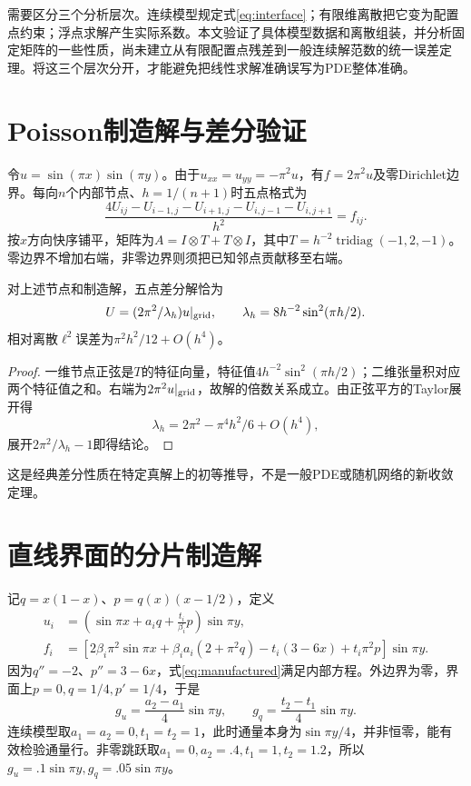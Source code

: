 需要区分三个分析层次。连续模型规定式\eqref{eq:interface}；有限维离散把它变为配置点约束；浮点求解产生实际系数。本文验证了具体模型数据和离散组装，并分析固定矩阵的一些性质，尚未建立从有限配置点残差到一般连续解范数的统一误差定理。将这三个层次分开，才能避免把线性求解准确误写为PDE整体准确。

\section{Poisson制造解与差分验证}
令$u=\sin(\pi x)\sin(\pi y)$。由于$u_{xx}=u_{yy}=-\pi^2u$，有$f=2\pi^2u$及零Dirichlet边界。每向$n$个内部节点、$h=1/(n+1)$时五点格式为
\begin{equation}\label{eq:fdm}
\frac{4U_{ij}-U_{i-1,j}-U_{i+1,j}-U_{i,j-1}-U_{i,j+1}}{h^2}=f_{ij}.
\end{equation}
按$x$方向快序铺平，矩阵为$A=I\otimes T+T\otimes I$，其中$T=h^{-2}\operatorname{tridiag}(-1,2,-1)$。零边界不增加右端，非零边界则须把已知邻点贡献移至右端。

\begin{proposition}[正弦算例的离散误差]
对上述节点和制造解，五点差分解恰为
\[U=(2\pi^2/\lambda_h)u|_{\rm grid},\qquad\lambda_h=8h^{-2}\sin^2(\pi h/2).\]
相对离散$\ell^2$误差为$\pi^2h^2/12+O(h^4)$。
\end{proposition}
\begin{proof}
一维节点正弦是$T$的特征向量，特征值$4h^{-2}\sin^2(\pi h/2)$；二维张量积对应两个特征值之和。右端为$2\pi^2u|_{\rm grid}$，故解的倍数关系成立。由正弦平方的Taylor展开得
\[\lambda_h=2\pi^2-\pi^4h^2/6+O(h^4),\]
展开$2\pi^2/\lambda_h-1$即得结论。
\end{proof}
这是经典差分性质在特定真解上的初等推导，不是一般PDE或随机网络的新收敛定理。

\section{直线界面的分片制造解}
记$q=x(1-x)$、$p=q(x)(x-1/2)$，定义
\begin{align}
u_i&=\left(\sin\pi x+a_iq+\frac{t_i}{\beta_i}p\right)\sin\pi y,\label{eq:manufactured}\\
f_i&=\left[2\beta_i\pi^2\sin\pi x+\beta_i a_i(2+\pi^2q)-t_i(3-6x)+t_i\pi^2p\right]\sin\pi y.
\end{align}
因为$q''=-2$、$p''=3-6x$，式\eqref{eq:manufactured}满足内部方程。外边界为零，界面上$p=0,q=1/4,p'=1/4$，于是
\begin{equation}
g_u=\frac{a_2-a_1}{4}\sin\pi y,\qquad g_q=\frac{t_2-t_1}{4}\sin\pi y.
\end{equation}
连续模型取$a_1=a_2=0,t_1=t_2=1$，此时通量本身为$\sin\pi y/4$，并非恒零，能有效检验通量行。非零跳跃取$a_1=0,a_2=.4,t_1=1,t_2=1.2$，所以$g_u=.1\sin\pi y,g_q=.05\sin\pi y$。

